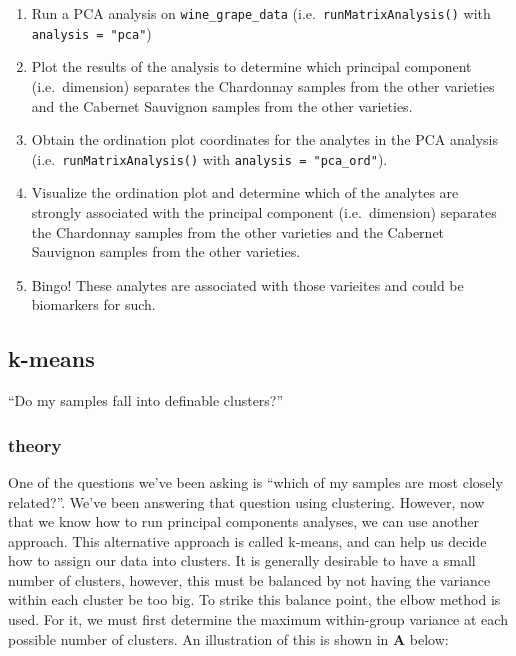 \documentclass[
]{krantz}
\providecommand{\tightlist}{%
  \setlength{\itemsep}{0pt}\setlength{\parskip}{0pt}}
\begin{document}
\begin{enumerate}
\def\labelenumi{\arabic{enumi}.}
\tightlist
\item
  Run a PCA analysis on \texttt{wine\_grape\_data} (i.e.~\texttt{runMatrixAnalysis()} with \texttt{analysis\ =\ "pca"})
\item
  Plot the results of the analysis to determine which principal component (i.e.~dimension) separates the Chardonnay samples from the other varieties and the Cabernet Sauvignon samples from the other varieties.
\item
  Obtain the ordination plot coordinates for the analytes in the PCA analysis (i.e.~\texttt{runMatrixAnalysis()} with \texttt{analysis\ =\ "pca\_ord"}).
\item
  Visualize the ordination plot and determine which of the analytes are strongly associated with the principal component (i.e.~dimension) separates the Chardonnay samples from the other varieties and the Cabernet Sauvignon samples from the other varieties.
\item
  Bingo! These analytes are associated with those varieites and could be biomarkers for such.
\end{enumerate}

\hypertarget{k-means}{%
\subsection{k-means}\label{k-means}}

``Do my samples fall into definable clusters?''

\hypertarget{theory-1}{%
\subsubsection{theory}\label{theory-1}}

One of the questions we've been asking is ``which of my samples are most closely related?''. We've been answering that question using clustering. However, now that we know how to run principal components analyses, we can use another approach. This alternative approach is called k-means, and can help us decide how to assign our data into clusters. It is generally desirable to have a small number of clusters, however, this must be balanced by not having the variance within each cluster be too big. To strike this balance point, the elbow method is used. For it, we must first determine the maximum within-group variance at each possible number of clusters. An illustration of this is shown in \textbf{A} below:
\end{document}
